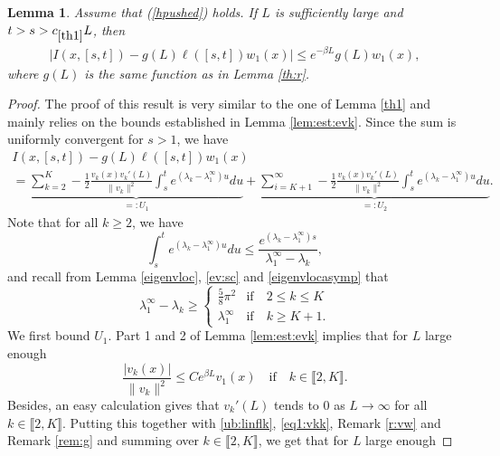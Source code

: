 \documentclass[11pt]{article}
\theoremstyle{plain}
\newtheorem{lemma}{Lemma}[section]
\newcommand\linf{\lambda_1^\infty}
\begin{document}
\begin{lemma}\label{lemma:infs}
Assume that (\ref{hpushed}) holds. If $L$ is sufficiently large and $t>s>c_{\ref{th1}}L$, then  
\begin{eqnarray*}
\left|I(x,[s,t])-g(L)\ell([s,t])w_1(x)\right| 
\leqslant  e^{-\beta L}g(L)w_1(x),
\end{eqnarray*} 
where $g(L)$ is the same function as in Lemma \ref{th:r}.
\end{lemma}

\begin{proof} The proof of this result is very similar to the one of Lemma \ref{th1} and mainly relies on the bounds established in Lemma \ref{lem:est:evk}. 
Since the sum is uniformly convergent for $s>1$, we have
\begin{multline*}
I(x,[s,t])-g(L)\ell([s,t])w_1(x)\\=\underbrace{\sum_{k=2}^K -\frac{1}{2}\frac{v_k(x)v_k'(L)}{\|v_k\|^2}\int_{s}^te^{(\lambda_k-\linf)u}du}_{\textstyle{=:U_1}}
    +\underbrace{\sum_{i=K+1}^\infty -\frac{1}{2}\frac{v_k(x)v_k'(L)}{\|v_k\|^2}\int_{s}^te^{(\lambda_k-\linf)u}du}_{\textstyle=:U_2}.
\end{multline*}
Note that for all $k\geqslant 2$, we have 
\begin{equation}\int_s^te^{(\lambda_k-\linf)u}du\leq  \frac{e^{(\lambda_k-\linf)s}}{\linf-\lambda_k},
\label{dis:e}
\end{equation}
and recall from Lemma \ref{eigenvloc}, \ref{ev:sc} and \ref{eigenvlocasymp} that 
\begin{equation}\label{ub:linflk}
\linf-\lambda_{k}\geqslant \begin{cases}\frac{5}{8}\pi^2 &\text{if} \quad 2\leqslant k \leqslant K\\
\linf & \text{if} \quad  k\geqslant K+1.\end{cases}
\end{equation} 
We first bound $U_1$. Part 1 and 2 of Lemma \ref{lem:est:evk} implies that for $L$ large enough 
    \begin{equation}
        \frac{\left|v_k(x)\right|}{\|v_k\|^2}\leqslant  C e^{\beta L}v_1(x) \quad \text{if} \quad k\in \llbracket 2, K\rrbracket.\label{eq1:vkk}
    \end{equation}
Besides, an easy calculation gives that $v_k'(L)$ tends to $0$ as $L\to \infty$ for all $k\in\llbracket 2, K\rrbracket$. 
Putting this together with \eqref{ub:linflk}, \eqref{eq1:vkk}, Remark \ref{r:vw} and Remark \ref{rem:g} and summing over $k\in \llbracket 2, K\rrbracket$, we get that for $L$ large enough

\end{proof}
\end{document}
